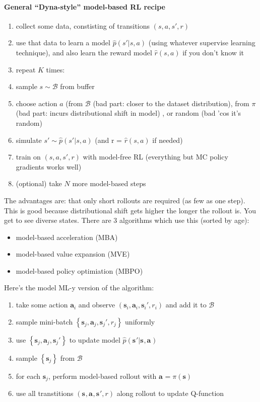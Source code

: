 \documentclass{report}
\begin{document}
\paragraph{General ``Dyna-style'' model-based RL recipe}
\begin{enumerate}
		\item collect some data, constisting of transitions $(s,a,s',r)$
		\item use that data to learn a model $\hat{p}(s'|s,a)$ (using whatever supervise learning technique), 
		and also learn the reward model $\hat{r}(s,a)$ if you don't know it
\item repeat $K$ times:
\item sample $s \sim \mathcal{B}$ from buffer
\item choose action $a$ (from $\mathcal{B}$ (bad part: closer to the dataset distribution), 
		from $\pi$ (bad part: incurs distributional shift in model) , or random (bad 'cos it's random)
\item simulate $s' \sim \hat{p}(s'|s,a)$ (and r = $\hat{r}(s,a)$ if needed)
\item train on $(s,a,s',r)$ with model-free RL (everything but MC policy gradients works well)
\item (optional) take $N$ more model-based steps
\end{enumerate}
The advantages are: that only short rollouts are required (as few as one step). 
This is good because distributional shift gets higher the longer the rollout is.
You get to see diverse states.
There are 3 algorithms which use this (sorted by age): 
\begin{itemize}
		\item model-based acceleration (MBA)
		\item model-based value expansion (MVE)
		\item model-based policy optimiation (MBPO)
\end{itemize}
Here's the model ML-y version of the algorithm:
\begin{enumerate}
		\item take some action $\bm{a}_{i}$ and observe $ \left( \bm{s}_{i}, \bm{a}_{i}, \bm{s}_{i}', r_i \right)   $ and add it to $ \mathcal{B}  $
		\item sample mini-batch $ \left\{  \bm{s}_{j}, \bm{a}_{j}, \bm{s}_{j}', r_j \right\}   $ uniformly
		\item use  $ \left\{  \bm{s}_{j}, \bm{a}_{j}, \bm{s}_{j}' \right\}   $ to update model $\hat{p} (\bm{s}_{}'|\bm{s}_{},\bm{a}_{})$
		\item sample $\left\{ \bm{s}_{j} \right\} $ from $ \mathcal{B}  $
		\item for each $\bm{s}_{j}$, perform model-based rollout with $\bm{a}_{} = \pi(\bm{s})$
		\item use all transtitions $ \left( \bm{s}_{}, \bm{a}_{}, \bm{s}_{}', r \right)   $ along rollout to update Q-function
\end{enumerate}
\end{document}
